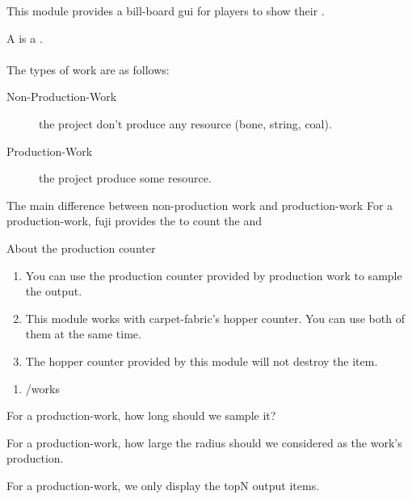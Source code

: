 
This module provides a bill-board gui for players to show their .

A  is a . \\
\\
The types of work are as follows:
\begin{description}
    \item [Non-Production-Work] the project don't produce any resource (\eg bone, string, coal).
    \item[Production-Work] the project produce some resource.
\end{description}

\begin{note}{The main difference between non-production work and production-work}
    For a production-work, fuji provides the  to count the  and 
\end{note}

\begin{tips}{About the production counter}
    \begin{enumerate}
        \item You can use the production counter provided by production work to sample the output.
        \item {This module works with carpet-fabric's hopper counter. You can use both of them at the same time.}
        \item The hopper counter provided by this module will not destroy the item.
    \end{enumerate}

\end{tips}

\begin{enumerate}
    \item /works
\end{enumerate}

\begin{Configuration}
    \item[sample\_time\_ms]{
        For a production-work, how long should we sample it?
    }
    \item[sample\_distance\_limit]{
        For a production-work, how large the radius should we considered as the work's production.
    }
    \item[sample\_counter\_top\_n]{
        For a production-work, we only display the topN output items.
    }
\end{Configuration}









